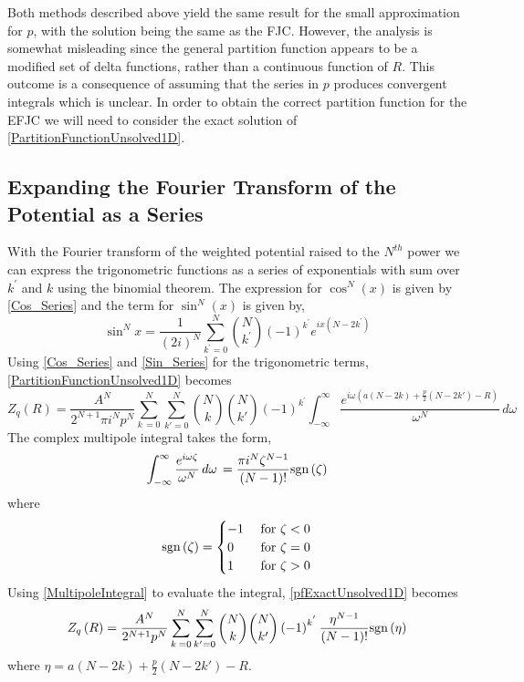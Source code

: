 Both methods described above yield the same result for the small approximation for $p$, with the solution being the same as the FJC. However, the analysis is somewhat misleading since the general partition function appears to be a modified set of delta functions, rather than a continuous function of $R$. This outcome is a consequence of assuming that the series in $p$ produces convergent integrals which is unclear. In order to obtain the correct partition function for the EFJC we will need to  consider the exact solution of \eqref{PartitionFunctionUnsolved1D}.

\subsection{Expanding the Fourier Transform of the Potential as a Series}

With the Fourier transform of the weighted potential raised to the $N^{th}$ power we can express the trigonometric functions as a series of exponentials with sum over $k^{'}$ and $k$ using the binomial theorem. The expression for $\cos^{N}\left(x\right)$ is given by \eqref{Cos_Series} and the term for $\sin^{N}\left(x\right)$ is given by,
%
\begin{equation}
\sin^{N}x=\frac{1}{(2i)^{N}}\sum_{k^{'}=0}^{N}\binom{N}{k^{'}}(-1)^{k^{'}}e^{ix(N-2k^{'})}\label{Sin_Series}
\end{equation}
%
Using \eqref{Cos_Series} and \eqref{Sin_Series} for the trigonometric terms, \eqref{PartitionFunctionUnsolved1D} becomes
%
\begin{equation}
Z_{q}\left(R\right)=\frac{A^{N}}{2^{N+1}\pi i^N p^{N}}\sum_{k^{\,}=0}^{N}\sum_{{k}'=0}^{N}\binom{N}{k}\binom{N}{k'}\left(-1\right)^{k^{'}}\int_{-\infty}^{\infty}\frac{e^{i\omega\left(a\left(N-2k\right)+\frac{p}{2}\left(N-2{k}'\right)-R\right)}}{\omega^{N}}\, d\omega\label{pfExactUnsolved1D}
\end{equation}
%
The complex multipole integral takes the form,
%
\begin{equation}
\int_{-\infty}^{\infty}\frac{e^{i\omega\zeta}}{\omega^{N}}\, d\omega\,=\frac{\pi i^{N}\zeta^{N-1}}{\left(N-1\right)!}\text{sgn}\left(\zeta\right)\label{MultipoleIntegral}
\end{equation}
%
where
%
\begin{equation}
\text{sgn}\left(\zeta\right)=\begin{cases}
-1 & \text{ for }\zeta<0\\
0 & \text{ for }\zeta=0\\
1 & \text{ for }\zeta>0\end{cases}\label{sign}
\end{equation}
%
Using \eqref{MultipoleIntegral} to evaluate the integral, \eqref{pfExactUnsolved1D} becomes
%
\begin{equation}
Z_{q}\left(R\right)=\frac{A^{N}}{2^{N+1} p^{N}}\sum_{k^{\,}=0}^{N}\sum_{{k}'=0}^{N}\binom{N}{k}\binom{N}{k'}\left(-1\right)^{k^{'}}\frac{\eta^{N-1}}{\left(N-1\right)!}\text{sgn}\left(\eta\right)\label{PartitionFunction1DSolved}
\end{equation}
%
where $\eta=a\left(N-2k\right)+\frac{p}{2}\left(N-2{k}'\right)-R$.

